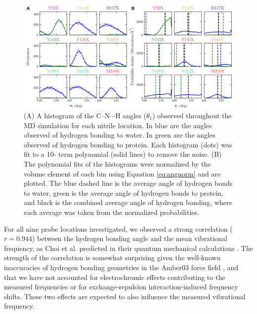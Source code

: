 \begin{figure}
    \center
    \includegraphics[width=\double]{figures-gfp-hbond/FigureS4_combined.png}
    \caption[Histograms of C--N$\cdots$H angle to calculate most probable $\theta_1$]{
        (A) A histogram of the C--N$\cdots$H angles ($\theta_1$) observed throughout the MD simulation for each nitrile location. 
        In blue are the angles observed of hydrogen bonding to water. 
        In green are the angles observed of hydrogen bonding to protein. 
        Each histogram (dots) was fit to a 10- term polynomial (solid lines) to remove the noise. 
        (B) The polynomial fits of the histograms were normalized by the volume element of each bin using Equation \ref{eq:angnorm} and are plotted. 
        The blue dashed line is the average angle of hydrogen bonds to water, green is the average angle of hydrogen bonds to protein, and black is the combined average angle of hydrogen bonding, where each average was taken from the normalized probabilities.
    }
    \label{fig:hbond-theta_histogram}
\end{figure}

For all nine probe locations investigated, we observed a strong correlation ($r = 0.944$) between the hydrogen bonding angle and the mean vibrational frequency, as Choi et al. predicted in their quantum mechanical calculations \cite{Choi2008}.
The strength of the correlation is somewhat surprising given the well-known inaccuracies of hydrogen bonding geometries in the Amber03 force field \cite{Paton2009}, and that we have not accounted for electrochromic effects contributing to the measured frequencies or for exchange-repulsion interaction-induced frequency shifts.
These two effects are expected to also influence the measured vibrational frequency.  

